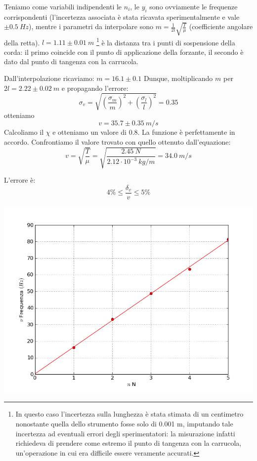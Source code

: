 Teniamo come variabili indipendenti le $n_i$, le $y_i$ sono ovviamente le frequenze corrispondenti (l'incertezza associata è stata ricavata sperimentalmente e vale $\pm0.5\ Hz$), mentre i parametri da interpolare sono $m=\frac{1}{2l}\sqrt{\frac{T}{\mu}}$ (coefficiente angolare della retta).
$l=1.11\pm0.01\ m$ \footnote{In questo caso l'incertezza sulla lunghezza è stata stimata di un centimetro nonostante quella dello strumento fosse solo di 0.001 m, imputando tale incertezza ad eventuali errori degli sperimentatori: la misurazione infatti richiedeva di prendere come estremo il punto di tangenza con la carrucola, un'operazione in cui era difficile essere veramente accurati.}
è la distanza tra i punti di sospensione della corda: il primo coincide con il punto di applicazione della forzante, il secondo è dato dal punto di tangenza con la carrucola.  

Dall'interpolazione ricaviamo: $m=16.1\pm0.1$ Dunque, moltiplicando $m$ per $2l=2.22\pm0.02\ m$ e propagando l'errore:
$$\sigma_v=\sqrt{\left(\frac{\sigma_m}{m}\right)^2+\left(\frac{\sigma_l}{l}\right)^2}=0.35$$
otteniamo $$v=35.7\pm0.35\ m/s$$ 
Calcoliamo il  $\chi$ e otteniamo un valore di $0.8$. La funzione è perfettamente in accordo.  
Confrontiamo il valore trovato con quello ottenuto dall'equazione:
$$v=\sqrt{\frac{T}{\mu}}=\sqrt{\frac{2.45\ N}{2.12 \cdot10^{-3}\ kg/m}}=34.0\ m/s$$

L'errore è:
$$4\% \leq \frac{\delta_v}{v} \leq 5\% $$




\begin{center}

\includegraphics[scale=0.5]{../grafici/corda_1armonica}
\end{center}


